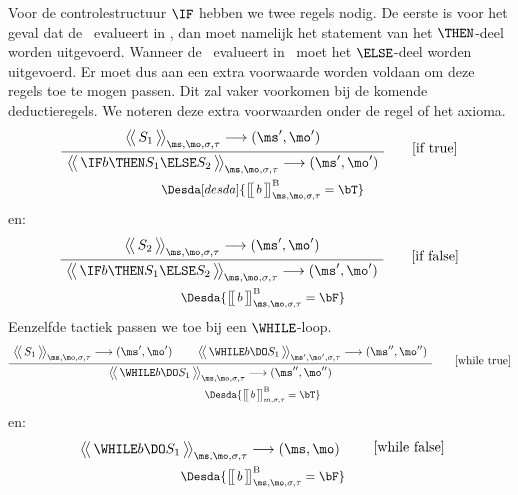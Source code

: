 Voor de controlestructuur $\IF$ hebben we twee regels nodig. De eerste is voor het geval dat de \BExpr\ evalueert in \bT, dan moet namelijk het statement van het $\THEN$-deel worden uitgevoerd. Wanneer de \BExpr\ evalueert in \bF\ moet het $\ELSE$-deel worden uitgevoerd.
Er moet dus aan een extra voorwaarde worden voldaan om deze regels toe te mogen passen. Dit zal vaker voorkomen bij de komende deductieregels. We noteren deze extra voorwaarden onder de regel of het axioma.
%
\begin{gather*}
  \AxiomC{$
    \Config{S_1}{\ms, \mo, \sigma, \tau}
    \longrightarrow
    (\ms', \mo')
  $}
  \UnaryInfC{$
    \Config{\IF b \THEN  S_1 \ELSE S_2 }{\ms, \mo, \sigma, \tau}
    \longrightarrow
    (\ms', \mo')
  $}
  {\DisplayProof}
  \tag*{[if true]} \\
  \Desdas{
    \Desda[desda]{\Surr{b}^\text{B}_{\ms, \mo,\sigma,\tau} = \bT}
  }
\end{gather*}
%
en:
%
\begin{gather*}
  \AxiomC{$
    \Config{S_2}{\ms, \mo, \sigma, \tau}
    \longrightarrow
    (\ms', \mo')
  $}
  \UnaryInfC{$
    \Config{\IF b \THEN S_1 \ELSE S_2 }{\ms, \mo, \sigma, \tau}
    \longrightarrow
    (\ms', \mo')
  $}
  {\DisplayProof}
  \tag*{[if false]} \\
  \Desdas{
    \Desda{\Surr{b}^\text{B}_{\ms, \mo,\sigma,\tau} = \bF}
  }
\end{gather*}
%
Eenzelfde tactiek passen we toe bij een $\WHILE$-loop.
%
\begin{gather*}
  \AxiomC{$
    \Config{S_1}{\ms, \mo, \sigma, \tau}
    \longrightarrow
    (\ms',\mo')
  $}
  \AxiomC{$
    \Config{\WHILE b \DO S_1 }{\ms', \mo', \sigma, \tau}
    \longrightarrow
    (\ms'',\mo'')
  $}
  \BinaryInfC{$
    \Config{\WHILE b \DO S_1 }{\ms, \mo, \sigma, \tau}
    \longrightarrow
    (\ms'',\mo'')
  $}
  {\DisplayProof}
  \tag*{[while true]} \\
  \Desdas{
    \Desda{\Surr{b}^\text{B}_{m,\sigma,\tau} = \bT}
  }
\end{gather*}
%
en:
%
\begin{gather*}
  \AxiomC{$
    \Config{\WHILE b \DO S_1 }{\ms, \mo, \sigma, \tau}
    \longrightarrow
    (\ms, \mo)
  $}
  {\DisplayProof}
  \tag*{[while false]} \\
  \Desdas{
    \Desda{\Surr{b}^\text{B}_{\ms,\mo,\sigma,\tau} = \bF}
  }
\end{gather*}

